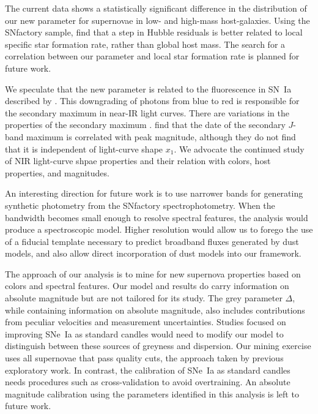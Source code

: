 \documentclass[trackchanges]{aastex61}   	%
\begin{document}
{The current data shows a statistically significant difference in the distribution of our new parameter for supernovae
in low- and high-mass host-galaxies.
Using the SNfactory sample,
\citet{2017Rigault} find that a step in Hubble residuals is better related to local 
specific
star 
formation rate, rather than
global host mass.  The search for a correlation between our parameter and local star formation rate is planned for future work.

We speculate that the new parameter is related to the fluorescence in SN~Ia described by  \citep{2006ApJ...649..939K}.
This downgrading of photons from blue to red is responsible for the secondary maximum in near-IR light curves.  There
are variations
in the properties of the secondary maximum \citep{1996AJ....112.2438H, 2005A&A...437..789N, 2010AJ....139..120F}.
\citet{2016MNRAS.463.4311S} find that the date of the secondary $J$-band maximum is correlated with peak
magnitude, although they do not find that it is independent of light-curve shape $x_1$.  We advocate
the continued study of
NIR light-curve shpae properties and their relation with colors, host properties, and  magnitudes.

}

An interesting direction for future work is to use narrower bands for generating synthetic photometry
from the SNfactory spectrophotometry.  When the bandwidth becomes small enough
to resolve spectral features, the analysis would produce a spectroscopic model.   Higher resolution would allow us to forego 
the use of a fiducial template necessary to predict broadband fluxes generated by dust models, and also allow direct incorporation
of dust models into our framework.


The approach of our analysis is to mine for new supernova properties based on colors and spectral features.
Our model and results do carry information on absolute magnitude but are not tailored for its study.
The grey parameter $\Delta$, while containing information on absolute magnitude, 
also 
includes
contributions from peculiar velocities and measurement uncertainties.  Studies
focused on improving SNe~Ia as standard candles 
would need to
modify  our model to
distinguish between these sources of greyness and dispersion.
Our
mining exercise uses all supernovae that pass quality cuts, the approach taken by previous
exploratory work.  In contrast, the calibration of SNe~Ia as standard candles needs procedures such
as cross-validation to avoid overtraining.
An absolute magnitude calibration using the parameters identified in this analysis is left to future work.
\end{document}
